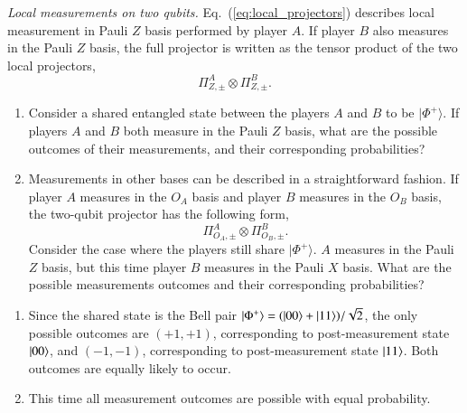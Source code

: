 \begin{exercise}
\emph{Local measurements on two qubits.}
Eq.~(\ref{eq:local_projectors}) describes local measurement in Pauli $Z$ basis performed by player $A$.
If player $B$ also measures in the Pauli $Z$ basis, the full projector is written as the tensor product of the two local projectors,
\begin{equation}
    \Pi^A_{Z,\pm} \otimes \Pi^B_{Z,\pm}.
\end{equation}
\begin{enumerate}[label=(\alph*)]
    \item Consider a shared entangled state between the players $A$ and $B$ to be $|\Phi^+\rangle$. If players $A$ and $B$ both measure in the Pauli $Z$ basis, what are the possible outcomes of their measurements, and their corresponding probabilities?
    \item Measurements in other bases can be described in a straightforward fashion. If player $A$ measures in the $O_A$ basis and player $B$ measures in the $O_B$ basis, the two-qubit projector has the following form,
    \begin{equation}
    \Pi^A_{O_A,\pm} \otimes \Pi^B_{O_B,\pm}.
    \end{equation}
    Consider the case where the players still share $|\Phi^+\rangle$. $A$ measures in the Pauli $Z$ basis, but this time player $B$ measures in the Pauli $X$ basis. What are the possible measurements outcomes and their corresponding probabilities?
\end{enumerate}
\end{exercise}
\begin{solution}
\begin{enumerate}[label=(\alph*)]
    \item Since the shared state is the Bell pair $\left| \Phi^+ \right\rangle=(\left| 00 \right\rangle+\left| 11 \right\rangle)/\sqrt{2}$, the only possible outcomes are $(+1,+1)$, corresponding to post-measurement state $\left| 00 \right\rangle$, and $(-1,-1)$, corresponding to post-measurement state $\left| 11 \right\rangle$. Both outcomes are equally likely to occur.
    \item This time all measurement outcomes are possible with equal probability.
\end{enumerate}
\end{solution}

